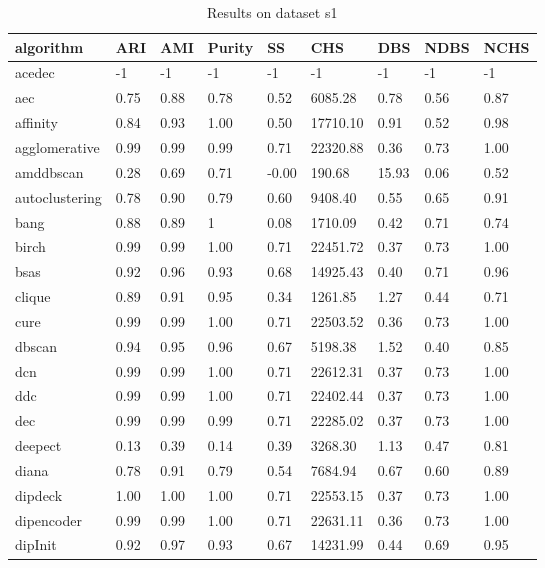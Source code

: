 \begin{table}[H]
\centering
\caption{Results on dataset s1}
\label{tab:params:s1}
\begin{tabular}{|l|l|l|l|l|l|l|l|l|}
\hline
algorithm & ARI & AMI & Purity & SS & CHS & DBS & NDBS & NCHS \\
\hline
acedec & -1 & -1 & -1 & -1 & -1 & -1 & -1 & -1 \\
\hline
aec & 0.75 & 0.88 & 0.78 & 0.52 & 6085.28 & 0.78 & 0.56 & 0.87 \\
\hline
affinity & 0.84 & 0.93 & 1.00 & 0.50 & 17710.10 & 0.91 & 0.52 & 0.98 \\
\hline
agglomerative & 0.99 & 0.99 & 0.99 & 0.71 & 22320.88 & 0.36 & 0.73 & 1.00 \\
\hline
amddbscan & 0.28 & 0.69 & 0.71 & -0.00 & 190.68 & 15.93 & 0.06 & 0.52 \\
\hline
autoclustering & 0.78 & 0.90 & 0.79 & 0.60 & 9408.40 & 0.55 & 0.65 & 0.91 \\
\hline
bang & 0.88 & 0.89 & 1 & 0.08 & 1710.09 & 0.42 & 0.71 & 0.74 \\
\hline
birch & 0.99 & 0.99 & 1.00 & 0.71 & 22451.72 & 0.37 & 0.73 & 1.00 \\
\hline
bsas & 0.92 & 0.96 & 0.93 & 0.68 & 14925.43 & 0.40 & 0.71 & 0.96 \\
\hline
clique & 0.89 & 0.91 & 0.95 & 0.34 & 1261.85 & 1.27 & 0.44 & 0.71 \\
\hline
cure & 0.99 & 0.99 & 1.00 & 0.71 & 22503.52 & 0.36 & 0.73 & 1.00 \\
\hline
dbscan & 0.94 & 0.95 & 0.96 & 0.67 & 5198.38 & 1.52 & 0.40 & 0.85 \\
\hline
dcn & 0.99 & 0.99 & 1.00 & 0.71 & 22612.31 & 0.37 & 0.73 & 1.00 \\
\hline
ddc & 0.99 & 0.99 & 1.00 & 0.71 & 22402.44 & 0.37 & 0.73 & 1.00 \\
\hline
dec & 0.99 & 0.99 & 0.99 & 0.71 & 22285.02 & 0.37 & 0.73 & 1.00 \\
\hline
deepect & 0.13 & 0.39 & 0.14 & 0.39 & 3268.30 & 1.13 & 0.47 & 0.81 \\
\hline
diana & 0.78 & 0.91 & 0.79 & 0.54 & 7684.94 & 0.67 & 0.60 & 0.89 \\
\hline
dipdeck & 1.00 & 1.00 & 1.00 & 0.71 & 22553.15 & 0.37 & 0.73 & 1.00 \\
\hline
dipencoder & 0.99 & 0.99 & 1.00 & 0.71 & 22631.11 & 0.36 & 0.73 & 1.00 \\
\hline
dipInit & 0.92 & 0.97 & 0.93 & 0.67 & 14231.99 & 0.44 & 0.69 & 0.95 \\

\end{tabular}
\end{table}
